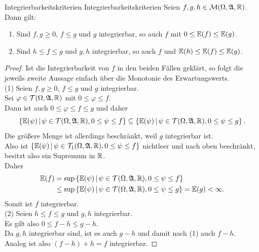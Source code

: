 \begin{lemma}{Integrierbarkeitskriterien}
             {Integrierbarkeitskriterien}
Seien $f, g, h \in \mathcal{M}(\Omega, \mathfrak{A}, \mathbb{R})$.\\
Dann gilt:
\begin{enumerate}[(1)]
	\item \label{Integrierbarkeitskriterien1}
 Sind $f, g \ge 0$, $f \le g$ und $g$ integrierbar, so auch $f$ mit
$0 \le \mathbb{E}(f) \le \mathbb{E}(g)$.
\item \label{Integrierbarkeitskriterien2}
 Sind $h \le f \le g$ und $g, h$ integrierbar, so auch $f$ und
$\mathbb{E}(h) \le \mathbb{E}(f) \le \mathbb{E}(g)$.
\end{enumerate}
\end{lemma}
\begin{proof}
Ist die Integrierbarkeit von $f$ in den beiden Fällen geklärt, so folgt die
jeweils zweite Aussage einfach über die Monotonie des Erwartungswerts.\\
(1) Seien $f, g \ge 0$, $f\le g$ und $g$ integrierbar.\\
Sei $\varphi \in \mathcal{T}(\Omega, \mathfrak{A}, \mathbb{R})$ mit $0 \le \varphi \le f$.\\
Dann ist auch $0 \le \varphi \le f \le g$ und daher
\[\left\{\mathbb{E}(\psi)\,|\,\psi \in \mathcal{T}(\Omega,\mathfrak{A},\mathbb{R}), 0 \le \psi\le f\right\}
\subseteq
 \left\{\mathbb{E}(\psi)\,|\,\psi \in \mathcal{T}(\Omega,\mathfrak{A},\mathbb{R}), 0 \le \psi\le g\right\}\text.\]
Die größere Menge ist allerdings beschränkt, weil $g$ integrierbar ist.\\
Also ist $\left\{\mathbb{E}(\psi)\,|\,\psi \in \mathcal{T}_1(\Omega,\mathfrak{A},\mathbb{R}), 0 \le \psi\le f\right\}$
nichtleer und nach oben beschränkt, besitzt also ein Supremum in $\mathbb{R}$.\\
Daher
\begin{align*}
\mathbb{E}(f)&=\sup\left\{\mathbb{E}(\psi)\,|\,\psi \in \mathcal{T}(\Omega,\mathfrak{A},\mathbb{R}), 0 \le \psi\le f\right\}\\
   &\le\sup\left\{\mathbb{E}(\psi)\,|\,\psi \in \mathcal{T}(\Omega,\mathfrak{A},\mathbb{R}), 0 \le \psi\le g\right\}
   = \mathbb{E}(g) < \infty\text.
\end{align*}
Somit ist $f$ integrierbar.\\
(2) Seien $h \le f \le g$ und $g, h$ integrierbar.\\
Es gilt also $0 \le f-h \le g -h$.\\
Da $g, h$ integrierbar sind, ist es auch $g-h$ und damit nach (1) auch $f-h$.\\
Analog ist also $(f-h)+ h = f$ integrierbar.
\end{proof}